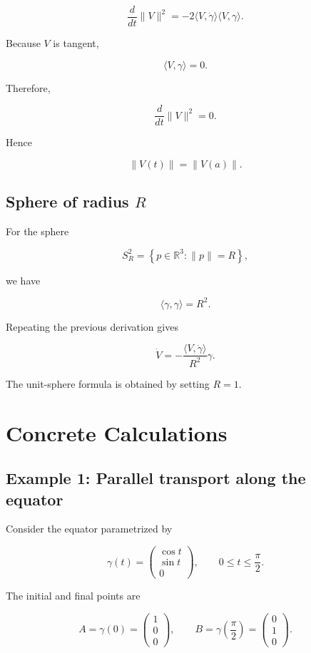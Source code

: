 \documentclass[12pt,a4paper]{article}
\theoremstyle{notespace}
\begin{document}
\[
\frac{d}{dt}\|V\|^2
=
-2\langle V,\dot\gamma\rangle
\langle V,\gamma\rangle.
\]

Because \(V\) is tangent,

\[
\langle V,\gamma\rangle=0.
\]

Therefore,

\[
\boxed{
	\frac{d}{dt}\|V\|^2=0.
}
\]

Hence

\[
\boxed{
	\|V(t)\|=\|V(a)\|.
}
\]

\subsection{Sphere of radius \(R\)}

For the sphere

\[
S_R^2
=
\left\{
p\in\mathbb{R}^3:
\|p\|=R
\right\},
\]

we have

\[
\langle\gamma,\gamma\rangle=R^2.
\]

Repeating the previous derivation gives

\[
\boxed{
	\dot V
	=
	-
	\frac{\langle V,\dot\gamma\rangle}{R^2}
	\gamma.
}
\]

The unit-sphere formula is obtained by setting \(R=1\).

\section{Concrete Calculations}

\subsection{Example 1: Parallel transport along the equator}

Consider the equator parametrized by

\[
\gamma(t)
=
\begin{pmatrix}
	\cos t\\
	\sin t\\
	0
\end{pmatrix},
\qquad
0\leq t\leq\frac{\pi}{2}.
\]

The initial and final points are

\[
A=\gamma(0)
=
\begin{pmatrix}
	1\\
	0\\
	0
\end{pmatrix},
\qquad
B=\gamma\left(\frac{\pi}{2}\right)
=
\begin{pmatrix}
	0\\
	1\\
	0
\end{pmatrix}.
\]
\end{document}
